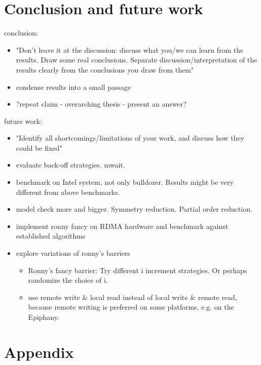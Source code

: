 \documentclass[a4paper, 10pt]{article}
\begin{document}
\begin{enumerate}
\section{Conclusion and future work}
\label{sec:conclusion}
conclusion:
\begin{itemize}
	\item "Don't leave it at the discussion: discuss what you/we can learn from the results. Draw some real conclusions. Separate discussion/interpretation of the results clearly from the conclusions you draw from them"
	\item condense results into a small passage
	\item ?repeat claim - overarching thesis - present an answer?
\end{itemize}

future work:
\begin{itemize}
	\item "Identify all shortcomings/limitations of your work, and discuss how they could be fixed"
	\item evaluate back-off strategies. mwait.
	\item benchmark on Intel system, not only bulldozer. Results might be very different from above benchmarks.
	\item model check more and bigger. Symmetry reduction. Partial order reduction.
	\item implement ronny fancy on RDMA hardware and benchmark against established algorithms
	\item explore variations of ronny's barriers
		\begin{itemize}
			\item Ronny's fancy barrier: Try different i increment strategies. Or perhaps randomize the choice of i.
			\item use remote write \& local read instead of local write \& remote read, because remote writing is preferred on some platforms, e.g. on the Epiphany\cite{epiphany}.
		\end{itemize}
\end{itemize}


\appendix

\pagebreak
\section{Appendix}
\label{sec:appendix}

\end{enumerate}
\end{document}
